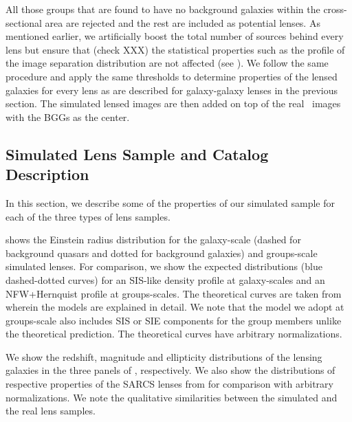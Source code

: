 \documentclass[useAMS,usenatbib,a4paper]{mn2e}
\begin{document}
All those groups that are found to have no background galaxies within the
cross-sectional area are rejected and the rest are included as potential lenses.
As mentioned earlier, we artificially boost the total number of sources behind
every lens but ensure that (check XXX) the statistical properties such as the profile of the
image separation distribution are not affected (see ). We
follow the same procedure and apply the same thresholds to determine properties
of the lensed galaxies for every lens as are described for galaxy-galaxy lenses
in the previous section. The simulated lensed images are then added on top of
the real \cfhtls~images with the BGGs as the center.


\subsection{Simulated Lens Sample and Catalog Description}

In this section, we describe some of the properties of our simulated sample for
each of the three types of lens samples.

 shows the Einstein radius distribution for the
galaxy-scale (dashed for background quasars and dotted for background galaxies)
and groups-scale simulated lenses. For comparison, we show the expected
distributions (blue dashed-dotted curves) for an SIS-like density profile at
galaxy-scales and an NFW+Hernquist profile at groups-scales. The
theoretical curves are taken from \citep{More2012} wherein the models are
explained in detail. We note that the model we adopt at groups-scale also
includes SIS or SIE components for the group members unlike the theoretical
prediction. The theoretical curves have arbitrary normalizations.

We show the redshift, magnitude and ellipticity distributions of the lensing
galaxies in the three panels of , respectively. We also show
the distributions of respective properties of the SARCS lenses from
\citep{More2012} for comparison with arbitrary normalizations. We note the
qualitative similarities between the simulated and the real lens samples.

\end{document}
